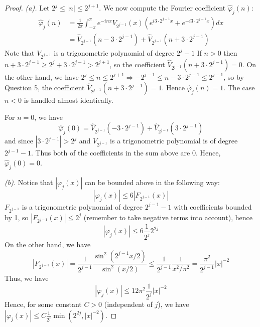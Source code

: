 \documentclass{article}
\renewcommand{\implies}{\Rightarrow}
\theoremstyle{definition} %
\numberwithin{thm}{section} %
\theoremstyle{definition} %
\begin{document}
\begin{proof}
\textit{(a).} Let $2^j \leq |n| \leq 2^{j + 1}$. We now compute the
Fourier coefficient $\hat{\varphi}_j(n)$:
\begin{align*}
    \hat{\varphi}_j(n)
    &= \frac{1}{2\pi}\int_{-\pi}^\pi e^{-inx}
    V_{2^{j-1}}(x)\left(e^{i 3 \cdot 2^{j-1} x} 
    + e^{-i 3 \cdot 2^{j-1} x}\right) dx \\
    &= \hat{V}_{2^{j-1}}\left(n - 3 \cdot 2^{j-1}\right)
    + \hat{V}_{2^{j-1}}\left(n + 3 \cdot 2^{j-1}\right)
\end{align*}
Note that $V_{2^{j - 1}}$ is a trigonometric polynomial of
degree $2^j - 1$
If $n > 0$ then $n + 3 \cdot 2^{j-1} \geq 2^j + 3 \cdot 2^{j-1} 
> 2^{j + 1}$, so the coefficient 
$\hat{V}_{2^{j-1}}\left(n + 3 \cdot 2^{j-1}\right) = 0$. On the 
other hand, we have $2^j \leq n \leq 2^{j + 1} \implies
-2^{j - 1} \leq n - 3 \cdot 2^{j - 1} \leq 2^{j - 1}$, so
by Question 5, the coefficient 
$\hat{V}_{2^{j-1}}\left(n + 3 \cdot 2^{j-1}\right) = 1$. Hence
$\hat{\varphi}_j(n) = 1$. The case $n < 0$ is handled almost identically.

For $n = 0$, we have
\[
    \hat{\varphi}_j(0) = \hat{V}_{2^{j-1}}\left(-3 \cdot 2^{j-1}\right)
    + \hat{V}_{2^{j-1}}\left(3 \cdot 2^{j-1}\right)
\]
and since $|3 \cdot 2^{j-1}| > 2^j$ and $V_{2^{j - 1}}$ is a 
trigonometric polynomial is of degree $2^{j - 1} - 1$.
Thus both of the coefficients in the sum above are 0.
Hence, $\hat{\varphi}_j(0) = 0$.

\textit{(b).}
Notice that $|\varphi_j(x)|$ can be bounded above in the following way:
\[
    |\varphi_j(x)| \leq 6|F_{2^{j - 1}}(x)|
\]
$F_{2^{j - 1}}$ is a trigonometric polynomial of degree $2^{j - 1} - 1$
with coefficients bounded by 1, so $|F_{2^{j - 1}}(x)|
\leq 2^j$ (remember to take negative terms into account), hence
\[
    |\varphi_j(x)| \leq 6\frac{1}{2^{j}}2^{2j}
\]
On the other hand, we have
\[
    |F_{2^{j - 1}}(x)| = \frac{1}{2^{j - 1}}
    \frac{\sin^2(2^{j - 1}x/2)}{\sin^2(x/2)} 
    \leq \frac{1}{2^{j - 1}}\frac{1}{x^2/\pi^2} 
    = \frac{\pi^2}{2^{j - 1}}|x|^{-2}
\]
Thus, we have
\[
    |\varphi_j(x)| \leq 12\pi^2\frac{1}{2^j}|x|^{-2}
\]
Hence, for some constant $C > 0$ (independent of $j$),
we have $|\varphi_j(x)| \leq C \frac{1}{2^j} \min(2^{2j}, |x|^{-2})$.


\end{proof}
\end{document}
